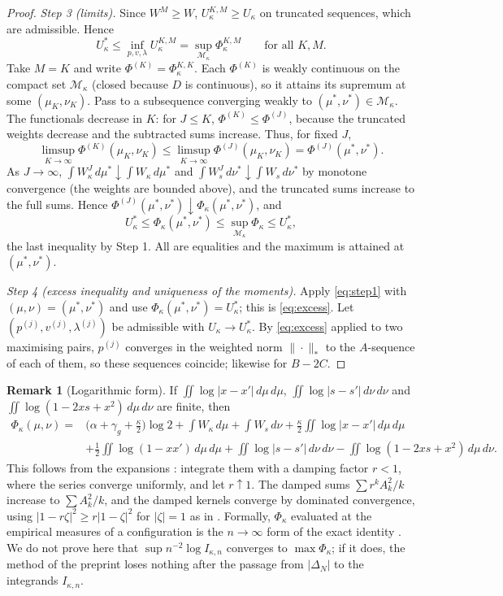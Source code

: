 \documentclass[11pt]{article}
\theoremstyle{definition}
\newtheorem{remark}[theorem]{Remark}
\begin{document}
\begin{proof}
\emph{Step 3 (limits).} Since $W^M\ge W$, $U^{K,M}_\kappa\ge U_\kappa$ on truncated sequences, which are admissible. Hence
\[
U^*_\kappa\le\inf_{p,v,\lambda}U^{K,M}_\kappa=\sup_{\mathcal M_\kappa}\Phi^{K,M}_\kappa\qquad\text{for all }K,M.
\]
Take $M=K$ and write $\Phi^{(K)}=\Phi^{K,K}_\kappa$. Each $\Phi^{(K)}$ is weakly continuous on the compact set $\mathcal M_\kappa$ (closed because $D$ is continuous), so it attains its supremum at some $(\mu_K,\nu_K)$. Pass to a subsequence converging weakly to $(\mu^*,\nu^*)\in\mathcal M_\kappa$. The functionals decrease in $K$: for $J\le K$, $\Phi^{(K)}\le\Phi^{(J)}$, because the truncated weights decrease and the subtracted sums increase. Thus, for fixed $J$,
\[
\limsup_{K\to\infty}\Phi^{(K)}(\mu_K,\nu_K)\le\limsup_{K\to\infty}\Phi^{(J)}(\mu_K,\nu_K)=\Phi^{(J)}(\mu^*,\nu^*).
\]
As $J\to\infty$, $\int W^J_\kappa\,d\mu^*\downarrow\int W_\kappa\,d\mu^*$ and $\int W^J_s\,d\nu^*\downarrow\int W_s\,d\nu^*$ by monotone convergence (the weights are bounded above), and the truncated sums increase to the full sums. Hence $\Phi^{(J)}(\mu^*,\nu^*)\downarrow\Phi_\kappa(\mu^*,\nu^*)$, and
\[
U^*_\kappa\le\Phi_\kappa(\mu^*,\nu^*)\le\sup_{\mathcal M_\kappa}\Phi_\kappa\le U^*_\kappa,
\]
the last inequality by Step 1. All are equalities and the maximum is attained at $(\mu^*,\nu^*)$.

\emph{Step 4 (excess inequality and uniqueness of the moments).} Apply \eqref{eq:step1} with $(\mu,\nu)=(\mu^*,\nu^*)$ and use $\Phi_\kappa(\mu^*,\nu^*)=U^*_\kappa$; this is \eqref{eq:excess}. Let $(p^{(j)},v^{(j)},\lambda^{(j)})$ be admissible with $U_\kappa\to U^*_\kappa$. By \eqref{eq:excess} applied to two maximising pairs, $p^{(j)}$ converges in the weighted norm $\|\cdot\|_*$ to the $A$-sequence of each of them, so these sequences coincide; likewise for $B-2C$.
\end{proof}

\begin{remark}[Logarithmic form]\label{rem:log}
If $\iint\log|x-x'|\,d\mu\,d\mu$, $\iint\log|s-s'|\,d\nu\,d\nu$ and $\iint\log(1-2xs+x^2)\,d\mu\,d\nu$ are finite, then
\begin{align*}
\Phi_\kappa(\mu,\nu)={}&\Big(\alpha+\gamma_g+\frac{\kappa}{2}\Big)\log2+\int W_\kappa\,d\mu+\int W_s\,d\nu+\frac{\kappa}{2}\iint\log|x-x'|\,d\mu\,d\mu\\
&+\frac12\iint\log(1-xx')\,d\mu\,d\mu+\iint\log|s-s'|\,d\nu\,d\nu-\iint\log(1-2xs+x^2)\,d\mu\,d\nu .
\end{align*}
This follows from the expansions \cite[Eqs.~(81), (82)]{OAI}: integrate them with a damping factor $r<1$, where the series converge uniformly, and let $r\uparrow1$. The damped sums $\sum r^kA_k^2/k$ increase to $\sum A_k^2/k$, and the damped kernels converge by dominated convergence, using $|1-r\zeta|^2\ge r|1-\zeta|^2$ for $|\zeta|=1$ as in \cite[Sec.~6]{OAI}. Formally, $\Phi_\kappa$ evaluated at the empirical measures of a configuration is the $n\to\infty$ form of the exact identity \cite[Eq.~(80)]{OAI}. We do not prove here that $\sup n^{-2}\log I_{\kappa,n}$ converges to $\max\Phi_\kappa$; if it does, the method of the preprint loses nothing after the passage from $|\Delta_N|$ to the integrands $I_{\kappa,n}$.
\end{remark}
\end{document}
